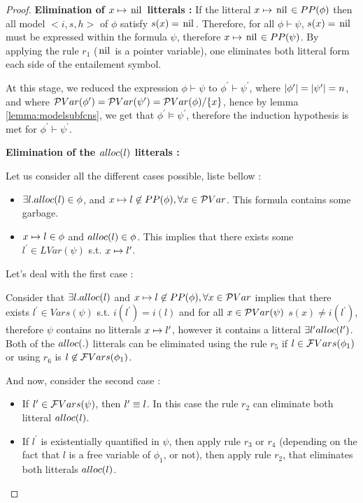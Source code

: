 \begin{proof}
\textbf{Elimination of $\Pointstonil{x}$ litterals :}
If the litteral
$\Pointstonil{x} \in \Pp{\phi}$ then all model $<i,s,h>$ of $\phi$ satisfy $s(x)=\nil$. Therefore, for all $\phi \vdash \psi$, $s(x)=\nil$ must be expressed within the formula $\psi$, therefore $\Pointstonil{x}\in\Pp{\psi}$. By applying the rule $r_1$ ($\nil$ is a pointer variable), one eliminates both litteral form each side of the entailement symbol.

At this stage, we reduced the expression $\phi \vdash \psi$ to $\phi^{\prime} \vdash \psi^{\prime}$, where $|{\phi^{\prime}}|=|{\psi^{\prime}}|=n$, and where
$\mathcal{P}Var(\phi^{\prime})=\mathcal{P}Var(\psi^{\prime})=\mathcal{P}Var(\phi)/\lbrace x \rbrace$, hence
by lemma \ref{lemma:modelsubfcns}, we get that $\phi^{\prime}\models\psi^{\prime}$, therefore the induction hypothesis is met for $\phi^{\prime}\vdash \psi^{\prime}$.

 
\textbf{Elimination of the $alloc(l)$ litterals :}  

Let us consider all the different cases possible, liste bellow :

\begin{itemize}
\item $\exists l.alloc(l) \in \phi$, and $x \mapsto l\not\in PP(\phi), \forall x\in \mathcal{P}Var$. This formula contains some garbage.

\item $x \mapsto l\in \phi$ and $alloc(l)\in \phi$. This implies
that there exists some $l^{\prime}\in LVar(\psi)$ s.t. $x \mapsto l^{\prime}$.
\end{itemize}

Let's deal with the first case :

Consider that $ \exists l. alloc(l) $ and $x \mapsto l\not\in PP(\phi), \forall x\in\mathcal{P}Var$ implies that there
exists $l^{\prime} \in Vars(\psi)$ s.t. $i(l^{\prime})=i(l)$ and for all $x\in \mathcal{P}Var (\psi)$ $s(x)\neq i(l^{\prime})$, therefore $\psi$ contains no litterals $x \mapsto l^{\prime}$, however it contains a litteral $\exists l^{\prime} alloc(l^{\prime})$. Both of the $alloc(.)$ litterals can be eliminated using 
the rule $r_5$ if $l\in \mathcal{F}Vars(\phi_1)$ or using $r_6$ is $l\not\in\mathcal{F}Vars(\phi_1)$.  

And now, consider the second case :

\begin{itemize}
\item If $l^{\prime}\in \mathcal{F}Vars(\psi)$, then $l^{\prime} \equiv l$. In this case the
rule $r_2$ can eliminate both litteral $alloc(l)$.
\item If $l^{\prime}$ is existentially quantified in $\psi$, then apply rule $r_3$ or $r_4$ (depending on the fact that $l$ is a free variable of $\phi_1$, or not), then apply rule $r_2$, that eliminates both litterals $alloc(l)$.
\end{itemize}




\end{proof}
